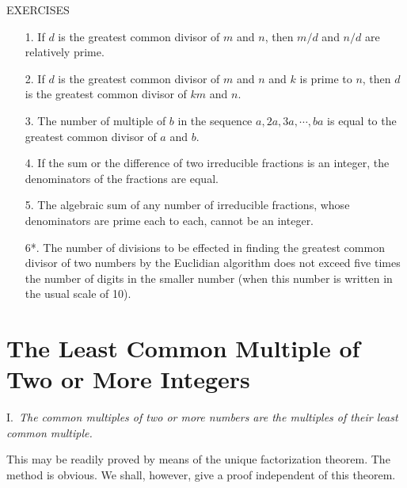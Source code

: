 \documentclass[oneside]{book}
\begin{document}
\begin{center}
EXERCISES
\end{center}

\small \begin{enumerate}
\item[1.] If $d$ is the greatest common divisor of $m$ and $n$,
then $m / d$ and $n / d$ are relatively prime.

\item[2.] If $d$ is the greatest common divisor of $m$ and $n$ and
$k$ is prime to $n$, then $d$ is the greatest common divisor of $km$
and $n$.

\item[3.] The number of multiple of $b$ in the sequence $a, 2a, 3a,
\cdots, ba$ is equal to the greatest common divisor of $a$ and $b$.

\item[4.] If the sum or the difference of two irreducible fractions is
an integer, the denominators of the fractions are equal.

\item[5.] The algebraic sum of any number of irreducible fractions,
whose denominators are prime each to each, cannot be an integer.

\item[6*.] The number of divisions to be effected in finding the
greatest common divisor of two numbers by the Euclidian algorithm
does not exceed five times the number of digits in the smaller
number (when this number is written in the usual scale of 10).
\end{enumerate}\normalsize%

\section{The Least Common Multiple of Two or More
Integers}\label{s10}%

I.~\emph{The common multiples of two or more numbers are the
multiples of their least common multiple.}

This may be readily proved by means of the unique factorization
theorem. The method is obvious. We shall, however, give a proof
independent of this theorem.
\end{document}
